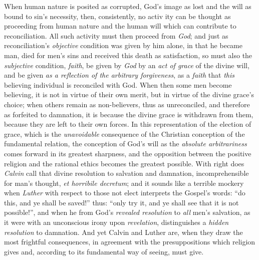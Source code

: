 \documentclass[12pt,a4paper]{book}
\begin{document}
When human nature is posited as corrupted, God's image as lost and the will as
bound to sin's necessity, then, consistently, no activ\-%
ity can be thought as proceeding from human nature and the human will which can
contribute to reconciliation. All such activity must then proceed from
\emph{God}; and just as reconciliation's \emph{objective} condition was given by
him alone, in that he became man, died for men's sins and received this death as
satisfaction, so must also the \emph{subjective} condition, \emph{faith}, be
given by \emph{God} by an \emph{act of grace} of the divine will, and be given
\emph{as a reflection of the arbitrary forgiveness}, as a \emph{faith} that
\emph{this} believing individual is reconciled with God. When then some men
become believing, it is not in virtue of their own merit, but in virtue of the
divine grace's choice; when others remain as non-believers, thus as
unreconciled, and therefore as forfeited to damnation, it is because the divine
grace is withdrawn from them, because they are left to their own forces. In this
representation of the election of grace, which is the \emph{unavoidable}
consequence of the Christian conception of the fundamental relation, the
conception of God's will as the \emph{absolute arbitrariness} comes forward in
its greatest sharpness, and the opposition between the positive religion and the
rational ethics becomes the greatest possible. With right does \emph{Calvin}
call that divine resolution to salvation and damnation, incomprehensible for
man's thought, \emph{\textit{et horribile decretum}}; and it sounds like a
terrible mockery when \emph{Luther} with respect to those not elect interprets
the Gospel's words: ``do this, and ye shall be saved!'' thus: ``only try it, and
ye shall see that it is not possible!'', and when he from God's \emph{revealed
resolution} to \emph{all} men's salvation, as it were with an unconscious irony
upon \emph{revelation}, distinguishes a \emph{hidden resolution} to damnation.
And yet Calvin and Luther are, when they draw the most frightful consequences,
in agreement with the presuppositions which religion gives and, according to its
fundamental way of seeing, must give.
\end{document}
